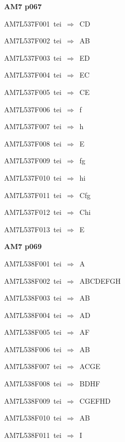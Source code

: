 \par\vfill\eject
{\bf\hfill AM7 p067\hfill\hbox{}}\par\bigskip
{\sixrm AM7L537F001\ {\sixit tei}\ }$\Rightarrow$\ CD\par\smallskip
{\sixrm AM7L537F002\ {\sixit tei}\ }$\Rightarrow$\ AB\par\smallskip
{\sixrm AM7L537F003\ {\sixit tei}\ }$\Rightarrow$\ ED\par\smallskip
{\sixrm AM7L537F004\ {\sixit tei}\ }$\Rightarrow$\ EC\par\smallskip
{\sixrm AM7L537F005\ {\sixit tei}\ }$\Rightarrow$\ CE\par\smallskip
{\sixrm AM7L537F006\ {\sixit tei}\ }$\Rightarrow$\ {\tenit f}\par\smallskip
{\sixrm AM7L537F007\ {\sixit tei}\ }$\Rightarrow$\ {\tenit h}\par\smallskip
{\sixrm AM7L537F008\ {\sixit tei}\ }$\Rightarrow$\ E\par\smallskip
{\sixrm AM7L537F009\ {\sixit tei}\ }$\Rightarrow$\ {\tenit fg}\par\smallskip
{\sixrm AM7L537F010\ {\sixit tei}\ }$\Rightarrow$\ {\tenit hi}\par\smallskip
{\sixrm AM7L537F011\ {\sixit tei}\ }$\Rightarrow$\ C{\tenit fg}\par\smallskip
{\sixrm AM7L537F012\ {\sixit tei}\ }$\Rightarrow$\ C{\tenit hi}\par\smallskip
{\sixrm AM7L537F013\ {\sixit tei}\ }$\Rightarrow$\ E\par\smallskip

\par\vfill\eject
{\bf\hfill AM7 p069\hfill\hbox{}}\par\bigskip
{\sixrm AM7L538F001\ {\sixit tei}\ }$\Rightarrow$\ A\par\smallskip
{\sixrm AM7L538F002\ {\sixit tei}\ }$\Rightarrow$\ ABCDEFGH\par\smallskip
{\sixrm AM7L538F003\ {\sixit tei}\ }$\Rightarrow$\ AB\par\smallskip
{\sixrm AM7L538F004\ {\sixit tei}\ }$\Rightarrow$\ AD\par\smallskip
{\sixrm AM7L538F005\ {\sixit tei}\ }$\Rightarrow$\ AF\par\smallskip
{\sixrm AM7L538F006\ {\sixit tei}\ }$\Rightarrow$\ AB\par\smallskip
{\sixrm AM7L538F007\ {\sixit tei}\ }$\Rightarrow$\ ACGE\par\smallskip
{\sixrm AM7L538F008\ {\sixit tei}\ }$\Rightarrow$\ BDHF\par\smallskip
{\sixrm AM7L538F009\ {\sixit tei}\ }$\Rightarrow$\ CGEFHD\par\smallskip
{\sixrm AM7L538F010\ {\sixit tei}\ }$\Rightarrow$\ AB\par\smallskip
{\sixrm AM7L538F011\ {\sixit tei}\ }$\Rightarrow$\ I\par\smallskip

